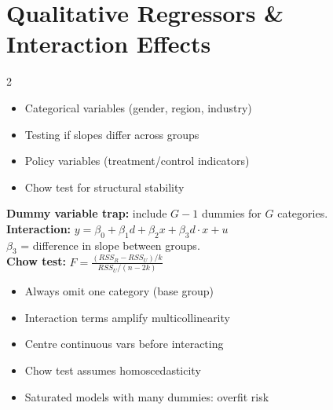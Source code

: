 \documentclass[10pt,a4paper]{article}
\begin{document}
\newpage

\section{Qualitative Regressors \& Interaction Effects}

\begin{multicols}{2}

\begin{tcolorbox}[when]
\begin{itemize}
  \item Categorical variables (gender, region, industry)
  \item Testing if slopes differ across groups
  \item Policy variables (treatment/control indicators)
  \item Chow test for structural stability
\end{itemize}
\end{tcolorbox}

\begin{tcolorbox}[key]
\textbf{Dummy variable trap:} include $G-1$ dummies for $G$ categories.\\[4pt]
\textbf{Interaction:} $y = \beta_0 + \beta_1 d + \beta_2 x + \beta_3 d \cdot x + u$\\
$\beta_3$ = difference in slope between groups.\\[4pt]
\textbf{Chow test:} $F = \frac{(RSS_R - RSS_U)/k}{RSS_U/(n - 2k)}$
\end{tcolorbox}

\columnbreak

\begin{tcolorbox}[watchout]
\begin{itemize}
  \item Always omit one category (base group)
  \item Interaction terms amplify multicollinearity
  \item Centre continuous vars before interacting
  \item Chow test assumes homoscedasticity
  \item Saturated models with many dummies: overfit risk
\end{itemize}
\end{tcolorbox}

\end{multicols}
\end{document}
